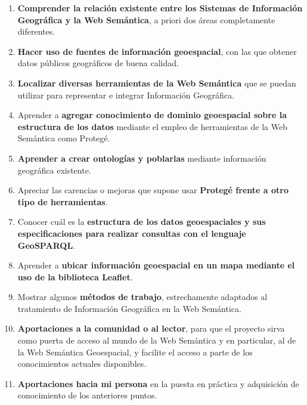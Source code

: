 \begin{enumerate}
	
	\item \textbf{Comprender la relación existente entre los Sistemas de Información Geográfica y la Web Semántica}, a priori dos áreas completamente diferentes.
	
	\item \textbf{Hacer uso de fuentes de información geoespacial}, con las que obtener datos públicos geográficos de buena calidad.
	
	\item \textbf{Localizar diversas herramientas de la Web Semántica} que se puedan utilizar para representar e integrar Información Geográfica.
	
	\item Aprender a \textbf{agregar conocimiento de dominio geoespacial sobre la estructura de los datos} mediante el empleo de herramientas de la Web Semántica como Protegé.
	
	\item \textbf{Aprender a crear ontologías y poblarlas}  mediante información geográfica existente.
	
	\item Apreciar las carencias o mejoras que supone usar \textbf{Protegé frente a otro tipo de herramientas}.
	
	\item Conocer cuál es la \textbf{estructura de los datos geoespaciales y sus especificaciones para realizar consultas con el lenguaje GeoSPARQL}.
	
	\item Aprender a \textbf{ubicar información geoespacial en un mapa mediante el uso de la biblioteca Leaflet}.
	
	\item Mostrar algunos \textbf{métodos de trabajo}, estrechamente adaptados al tratamiento de Información Geográfica en la Web Semántica.
	
	\item \textbf{Aportaciones a la comunidad o al lector}, para que el proyecto sirva como puerta de acceso al mundo de la Web Semántica y en particular, al de la Web Semántica Geoespacial, y facilite el acceso a parte de los conocimientos actuales disponibles.
	
	\item \textbf{Aportaciones hacia mi persona} en la puesta en práctica y adquisición de conocimiento de los anteriores puntos.
	
	

	
\end{enumerate}



